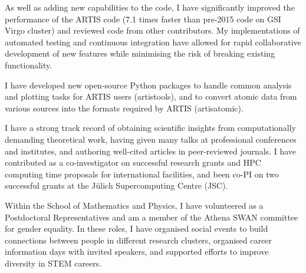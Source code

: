 \documentclass[11pt]{article} %
\begin{document}
As well as adding new capabilities to the code, I have significantly improved the performance of the ARTIS code (7.1 times faster than pre-2015 code on GSI Virgo cluster) and reviewed code from other contributors. My implementations of automated testing and continuous integration have allowed for rapid collaborative development of new features while minimising the risk of breaking existing functionality.

I have developed new open-source Python packages to handle common analysis and plotting tasks for ARTIS users (artistools), and to convert atomic data from various sources into the formats required by ARTIS (artisatomic).

I have a strong track record of obtaining scientific insights from computationally demanding theoretical work, having given many talks at professional conferences and institutes, and authoring well-cited articles in peer-reviewed journals. I have contributed as a co-investigator on successful research grants and HPC computing time proposals for international facilities, and been co-PI on two successful grants at the Jülich Supercomputing Centre (JSC).

Within the School of Mathematics and Physics, I have volunteered as a Postdoctoral Representatives and am a member of the Athena SWAN committee for gender equality. In these roles, I have organised social events to build connections between people in different research clusters, organised career information days with invited speakers, and supported efforts to improve diversity in STEM careers.


%
\end{document}
